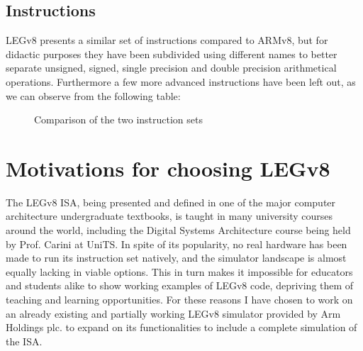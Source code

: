 \subsection*{Instructions}
LEGv8 presents a similar set of instructions compared to ARMv8, but for didactic purposes they have been subdivided using different names to better separate unsigned, signed, single precision and double precision arithmetical operations. Furthermore a few more advanced instructions have been left out, as we can observe from the following table:
\begin{figure}[h!]\label{fig:example}
	\centering
	\caption{Comparison of the two instruction sets}
\end{figure}
\section*{Motivations for choosing LEGv8}
The LEGv8 ISA, being presented and defined in one of the major computer architecture undergraduate textbooks, is taught in many university courses around the world, including the Digital Systems Architecture course being held by Prof. Carini at UniTS. In spite of its popularity, no real hardware has been made to run its instruction set natively, and the simulator landscape is almost equally lacking in viable options. This in turn makes it impossible for educators and students alike to show working examples of LEGv8 code, depriving them of teaching and learning opportunities. For these reasons I have chosen to work on an already existing and partially working LEGv8 simulator provided by Arm Holdings plc. to expand on its functionalities to include a complete simulation of the ISA. 


